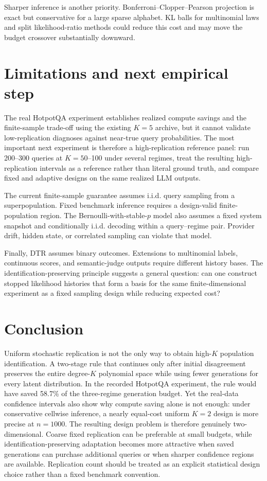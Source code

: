 \documentclass[11pt]{article}
\theoremstyle{remark}
\begin{document}
Sharper inference is another priority. Bonferroni--Clopper--Pearson projection is exact but conservative for a large sparse alphabet. KL balls for multinomial laws \citep{Mardia2020} and split likelihood-ratio methods \citep{Wasserman2020} could reduce this cost and may move the budget crossover substantially downward.

\section{Limitations and next empirical step}

The real HotpotQA experiment establishes realized compute savings and the finite-sample trade-off using the existing $K=5$ archive, but it cannot validate low-replication diagnoses against near-true query probabilities. The most important next experiment is therefore a high-replication reference panel: run 200--300 queries at $K=50$--100 under several regimes, treat the resulting high-replication intervals as a reference rather than literal ground truth, and compare fixed and adaptive designs on the same realized LLM outputs.

The current finite-sample guarantee assumes i.i.d. query sampling from a superpopulation. Fixed benchmark inference requires a design-valid finite-population region. The Bernoulli-with-stable-$p$ model also assumes a fixed system snapshot and conditionally i.i.d. decoding within a query--regime pair. Provider drift, hidden state, or correlated sampling can violate that model.

Finally, DTR assumes binary outcomes. Extensions to multinomial labels, continuous scores, and semantic-judge outputs require different history bases. The identification-preserving principle suggests a general question: can one construct stopped likelihood histories that form a basis for the same finite-dimensional experiment as a fixed sampling design while reducing expected cost?

\section{Conclusion}

Uniform stochastic replication is not the only way to obtain high-$K$ population identification. A two-stage rule that continues only after initial disagreement preserves the entire degree-$K$ polynomial space while using fewer generations for every latent distribution. In the recorded HotpotQA experiment, the rule would have saved 58.7\% of the three-regime generation budget. Yet the real-data confidence intervals also show why compute saving alone is not enough: under conservative cellwise inference, a nearly equal-cost uniform $K=2$ design is more precise at $n=1000$. The resulting design problem is therefore genuinely two-dimensional. Coarse fixed replication can be preferable at small budgets, while identification-preserving adaptation becomes more attractive when saved generations can purchase additional queries or when sharper confidence regions are available. Replication count should be treated as an explicit statistical design choice rather than a fixed benchmark convention.
\end{document}
